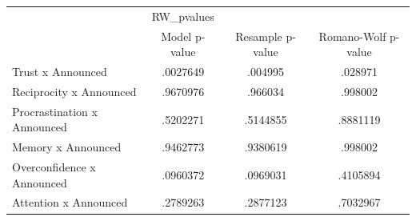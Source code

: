\begin{tabular}{l*{3}{c}}
\hline\hline
            &  RW\_pvalues&            &            \\
            &Model p-value&Resample p-value&Romano-Wolf p-value\\
\hline
Trust x Announced&    .0027649&     .004995&     .028971\\
Reciprocity x Announced&    .9670976&     .966034&     .998002\\
Procrastination x Announced&    .5202271&    .5144855&    .8881119\\
Memory x Announced&    .9462773&    .9380619&     .998002\\
Overconfidence x Announced&    .0960372&    .0969031&    .4105894\\
Attention x Announced&    .2789263&    .2877123&    .7032967\\
\hline\hline
\end{tabular}
